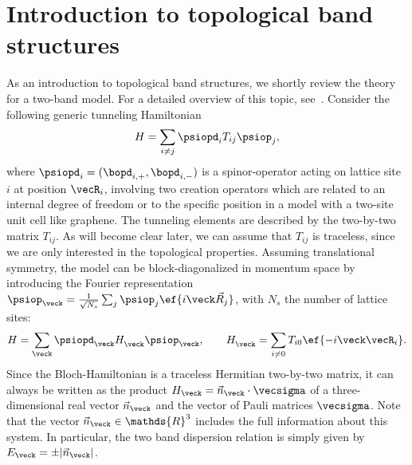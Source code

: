 \section{Introduction to topological band structures}

As an introduction to topological band structures, we shortly review the theory for a two-band model.
For a detailed overview of this topic, see~.
Consider the following generic tunneling Hamiltonian
\begin{align}
    H = \sum_{i\ne j} \psiopd_i T_{ij} \psiop_j,
\end{align}
where $\psiopd_i = (\bopd_{i,+}, \bopd_{i,-})$ is a spinor-operator acting on lattice site $i$ at position $\vecR_i$, involving two creation operators which are related to an internal degree of freedom or to the specific position in a model with a two-site unit cell like graphene.
The tunneling elements are described by the two-by-two matrix $T_{ij}$.
As will become clear later, we can assume that $T_{ij}$ is traceless, since we are only interested in the topological properties.
Assuming translational symmetry, the model can be block-diagonalized in momentum space by introducing the Fourier representation $\psiop_{\veck}=\frac{1}{\sqrt{N_s}}\sum_{j} \psiop_{j}\ef{i\veck\vec{R}_j}$, with $N_s$ the number of lattice sites:
\begin{align}
    H=\sum_\veck \psiopd_{\veck} H^{\vphantom\dag}_\veck \psiop_{\veck}, \qquad
    H^{\vphantom\dag}_\veck = \sum_{i\ne 0} T_{i0} \ef{-i\veck \vecR_i}.
\end{align}
Since the Bloch-Hamiltonian is a traceless Hermitian two-by-two matrix, it can always be written as the product $H_\veck = \vec{n}_\veck \cdot \vecsigma$ of a three-dimensional real vector $\vec{n}_{\veck}$ and the vector of Pauli matrices $\vecsigma$.
Note that the vector $\vec{n}_\veck \in \mathds{R}^3$ includes the full information about this system.
In particular, the two band dispersion relation is simply given by $E_\veck = \pm |\vec{n}_\veck|$.


